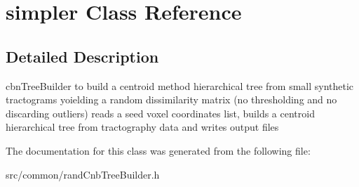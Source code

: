 \hypertarget{classsimpler}{\section{simpler \-Class \-Reference}
\label{classsimpler}
}


\subsection{\-Detailed \-Description}
cbn\-Tree\-Builder to build a centroid method hierarchical tree from small synthetic tractograms yoielding a random dissimilarity matrix (no thresholding and no discarding outliers) reads a seed voxel coordinates list, builds a centroid hierarchical tree from tractography data and writes output files 

\-The documentation for this class was generated from the following file\-:\begin{DoxyCompactItemize}
\item 
src/common/rand\-Cnb\-Tree\-Builder.\-h\end{DoxyCompactItemize}
